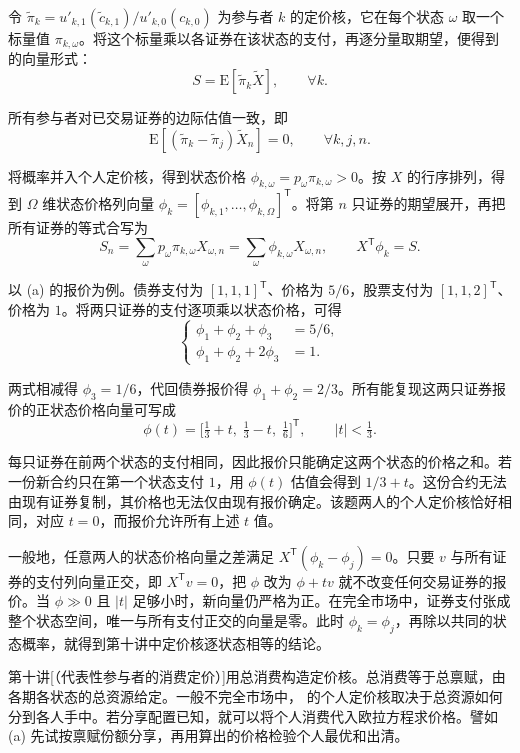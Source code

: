 令 $\widetilde\pi_k=u'_{k,1}(\widetilde c_{k,1})/u'_{k,0}(c_{k,0})$ 为参与者 $k$ 的定价核，它在每个状态 $\omega$ 取一个标量值 $\pi_{k,\omega}$。将这个标量乘以各证券在该状态的支付，再逐分量取期望，便得到 的向量形式：
\begin{equation}
 S=\mathrm E[\widetilde\pi_k\widetilde X],\qquad\forall k.
 \label{eq:wj-11-3}
\end{equation}

所有参与者对已交易证券的边际估值一致，即
\[
 \mathrm E[(\widetilde\pi_k-\widetilde\pi_j)\widetilde X_n]=0,\qquad\forall k,j,n.
\]

将概率并入个人定价核，得到状态价格 $\phi_{k,\omega}=p_\omega\pi_{k,\omega}>0$。按 $X$ 的行序排列，得到 $\Omega$ 维状态价格列向量 $\phi_k=[\phi_{k,1},\ldots,\phi_{k,\Omega}]^{\mathsf T}$。将第 $n$ 只证券的期望展开，再把所有证券的等式合写为
\[
 S_n=\sum_\omega p_\omega\pi_{k,\omega}X_{\omega,n}
     =\sum_\omega\phi_{k,\omega}X_{\omega,n},\qquad
 X^{\mathsf T}\phi_k=S.
\]

以 (a) 的报价为例。债券支付为 $[1,1,1]^{\mathsf T}$、价格为 $5/6$，股票支付为 $[1,1,2]^{\mathsf T}$、价格为 $1$。将两只证券的支付逐项乘以状态价格，可得
\[
 \left\{
 \begin{aligned}
 \phi_1+\phi_2+\phi_3&=5/6,\\
 \phi_1+\phi_2+2\phi_3&=1.
 \end{aligned}
 \right.
\]

两式相减得 $\phi_3=1/6$，代回债券报价得 $\phi_1+\phi_2=2/3$。所有能复现这两只证券报价的正状态价格向量可写成
\[
 \phi(t)=\bigl[\tfrac13+t,\;\tfrac13-t,\;\tfrac16\bigr]^{\mathsf T},
 \qquad |t|<\tfrac13.
\]

每只证券在前两个状态的支付相同，因此报价只能确定这两个状态的价格之和。若一份新合约只在第一个状态支付 $1$，用 $\phi(t)$ 估值会得到 $1/3+t$。这份合约无法由现有证券复制，其价格也无法仅由现有报价确定。该题两人的个人定价核恰好相同，对应 $t=0$，而报价允许所有上述 $t$ 值。

一般地，任意两人的状态价格向量之差满足 $X^{\mathsf T}(\phi_k-\phi_j)=0$。只要 $v$ 与所有证券的支付列向量正交，即 $X^{\mathsf T}v=0$，把 $\phi$ 改为 $\phi+tv$ 就不改变任何交易证券的报价。当 $\phi\gg0$ 且 $|t|$ 足够小时，新向量仍严格为正。在完全市场中，证券支付张成整个状态空间，唯一与所有支付正交的向量是零。此时 $\phi_k=\phi_j$，再除以共同的状态概率，就得到第十讲中定价核逐状态相等的结论。

第十讲[（代表性参与者的消费定价）]用总消费构造定价核。总消费等于总禀赋，由各期各状态的总资源给定。一般不完全市场中， 的个人定价核取决于总资源如何分到各人手中。若分享配置已知，就可以将个人消费代入欧拉方程求价格。譬如 (a) 先试按禀赋份额分享，再用算出的价格检验个人最优和出清。

